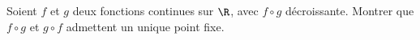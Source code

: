 \begin{enonce}
\begin{exercise}[ID={RMS127 E721},subtitle={Mines-Ponts PSI 2016},tags={}, difficulty={0}]
Soient $f$ et $g$ deux fonctions continues sur $\R$, avec $f\circ g$ décroissante.
Montrer que $f\circ g$ et $g\circ f$ admettent un unique point fixe.
\end{exercise}
\begin{solution}
\end{solution}
\end{enonce}
